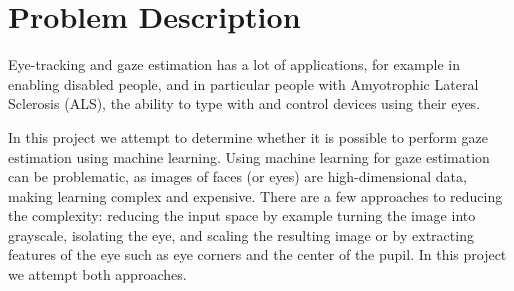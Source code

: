 \section{Problem Description}
Eye-tracking and gaze estimation has a lot of applications, for example in enabling disabled people, and in particular people with Amyotrophic Lateral Sclerosis (ALS), the ability to type with and control devices using their eyes.

In this project we attempt to determine whether it is possible to perform gaze estimation using machine learning. Using machine learning for gaze estimation can be problematic, as images of faces (or eyes) are high-dimensional data, making learning complex and expensive. There are a few approaches to reducing the complexity: reducing the input space by example turning the image into grayscale, isolating the eye, and scaling the resulting image or by extracting features of the eye such as eye corners and the center of the pupil. 
In this project we attempt both approaches.